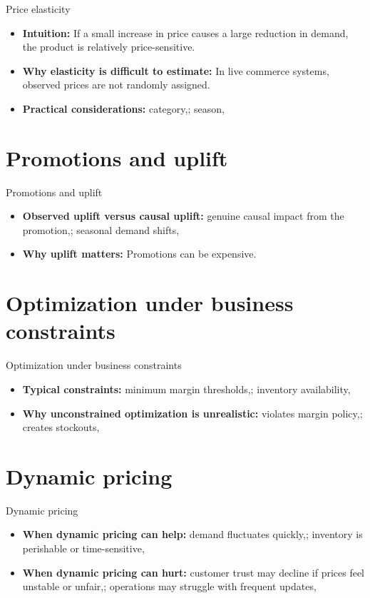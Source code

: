 \documentclass[aspectratio=169]{beamer}
\begin{document}
\begin{frame}{Price elasticity}
  \begin{itemize}
    \item \textbf{Intuition:} If a small increase in price causes a large reduction in demand, the product is relatively price-sensitive.
    \item \textbf{Why elasticity is difficult to estimate:} In live commerce systems, observed prices are not randomly assigned.
    \item \textbf{Practical considerations:} category,; season,
  \end{itemize}
\end{frame}

\section{Promotions and uplift}

\begin{frame}{Promotions and uplift}
  \begin{itemize}
    \item \textbf{Observed uplift versus causal uplift:} genuine causal impact from the promotion,; seasonal demand shifts,
    \item \textbf{Why uplift matters:} Promotions can be expensive.
  \end{itemize}
\end{frame}

\section{Optimization under business constraints}

\begin{frame}{Optimization under business constraints}
  \begin{itemize}
    \item \textbf{Typical constraints:} minimum margin thresholds,; inventory availability,
    \item \textbf{Why unconstrained optimization is unrealistic:} violates margin policy,; creates stockouts,
  \end{itemize}
\end{frame}

\section{Dynamic pricing}

\begin{frame}{Dynamic pricing}
  \begin{itemize}
    \item \textbf{When dynamic pricing can help:} demand fluctuates quickly,; inventory is perishable or time-sensitive,
    \item \textbf{When dynamic pricing can hurt:} customer trust may decline if prices feel unstable or unfair,; operations may struggle with frequent updates,
  \end{itemize}
\end{frame}
\end{document}
